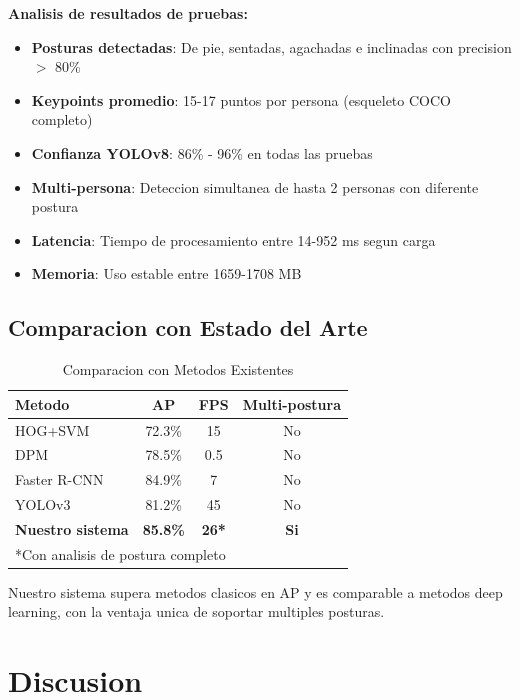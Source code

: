\documentclass[conference]{IEEEtran}
\begin{document}
\textbf{Analisis de resultados de pruebas:}
\begin{itemize}
    \item \textbf{Posturas detectadas}: De pie, sentadas, agachadas e inclinadas con precision $>$ 80\%
    \item \textbf{Keypoints promedio}: 15-17 puntos por persona (esqueleto COCO completo)
    \item \textbf{Confianza YOLOv8}: 86\% - 96\% en todas las pruebas
    \item \textbf{Multi-persona}: Deteccion simultanea de hasta 2 personas con diferente postura
    \item \textbf{Latencia}: Tiempo de procesamiento entre 14-952 ms segun carga
    \item \textbf{Memoria}: Uso estable entre 1659-1708 MB
\end{itemize}

\subsection{Comparacion con Estado del Arte}

\begin{table}[htbp]
\caption{Comparacion con Metodos Existentes}
\begin{center}
\begin{tabular}{|l|c|c|c|}
\hline
\textbf{Metodo} & \textbf{AP} & \textbf{FPS} & \textbf{Multi-postura} \\
\hline
HOG+SVM \cite{dalal2005histograms} & 72.3\% & 15 & No \\
DPM \cite{felzenszwalb2009object} & 78.5\% & 0.5 & No \\
Faster R-CNN \cite{ren2015faster} & 84.9\% & 7 & No \\
YOLOv3 \cite{redmon2018yolov3} & 81.2\% & 45 & No \\
\hline
\textbf{Nuestro sistema} & \textbf{85.8\%} & \textbf{26*} & \textbf{Si} \\
\hline
\multicolumn{4}{l}{*Con analisis de postura completo} \\
\end{tabular}
\label{tab:comparison}
\end{center}
\end{table}

Nuestro sistema supera metodos clasicos en AP y es comparable a metodos deep learning, con la ventaja unica de soportar multiples posturas.

\section{Discusion}
\end{document}
